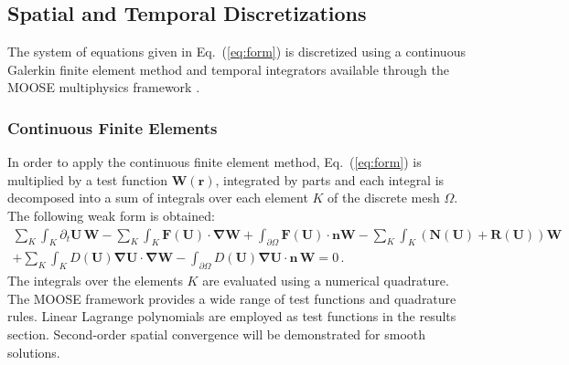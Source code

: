 \documentclass[preprint,10pt]{elsarticle}
\newcommand{\grad}{\mbold{\nabla}}
\newcommand{\mbold}[1]{\boldsymbol#1}
\newcommand{\eqt}[1]{Eq.~(\ref{#1})}                     %
\begin{document}
\subsection{Spatial and Temporal Discretizations} \label{sec:disc}
The system of equations given in \eqt{eq:form} is discretized using a continuous Galerkin finite element 
method and temporal integrators available through the MOOSE multiphysics framework \cite{MOOSE}.
\subsubsection{Continuous Finite Elements} 
In order to apply the continuous finite element method, \eqt{eq:form} is multiplied by a test function 
$\mathbf W(\mbold{r})$, integrated by parts and each integral is decomposed into a sum of integrals over 
each element $K$ of the discrete mesh $\Omega$. The following weak form is obtained:
\begin{multline}\label{eq:cfem}
\sum_K \int_{K} \partial_t \mathbf U \, \mathbf W - \sum_K \int_{K} \mathbf F (\mathbf U) \cdot \grad \mathbf W + \int_{\partial \Omega} \mathbf F (\mathbf U) \cdot \mbold{n} \mathbf W - \sum_K \int_{K} \left( \mathbf N (\mathbf U) + \mathbf R (\mathbf U) \right) \mathbf W  \\
+ \sum_K \int_{K} D(\mathbf U) \grad \mathbf U \cdot \grad \mathbf W 
- \int_{\partial \Omega} D(\mathbf U) \grad \mathbf U \cdot \mbold{n} \, \mathbf W = 0 \,.
\end{multline}
The integrals over the elements $K$ are evaluated using a numerical quadrature. The MOOSE framework 
provides a wide range of test functions and quadrature rules. Linear Lagrange polynomials are employed 
as test functions in the results section. Second-order spatial convergence will be demonstrated for smooth solutions. 

\end{document}
